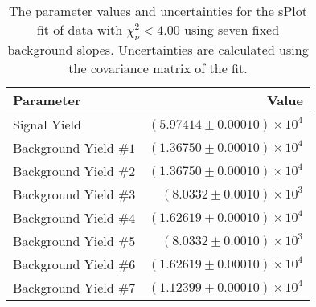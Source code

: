 
\begin{table}[ht]
    \begin{center}
        \begin{tabular}{lr}\toprule
            Parameter & Value \\\midrule
            Signal Yield & $(5.97414 \pm 0.00010) \times 10^{4}$ \\
            Background Yield $\#1$ & $(1.36750 \pm 0.00010) \times 10^{4}$ \\
            Background Yield $\#2$ & $(1.36750 \pm 0.00010) \times 10^{4}$ \\
            Background Yield $\#3$ & $(8.0332 \pm 0.0010) \times 10^{3}$ \\
            Background Yield $\#4$ & $(1.62619 \pm 0.00010) \times 10^{4}$ \\
            Background Yield $\#5$ & $(8.0332 \pm 0.0010) \times 10^{3}$ \\
            Background Yield $\#6$ & $(1.62619 \pm 0.00010) \times 10^{4}$ \\
            Background Yield $\#7$ & $(1.12399 \pm 0.00010) \times 10^{4}$ \\\bottomrule
        \end{tabular}
        \caption{The parameter values and uncertainties for the sPlot fit of data with $\chi^2_\nu < 4.00$ using seven fixed background slopes. Uncertainties are calculated using the covariance matrix of the fit.}\label{tab:splot-fit-results-chisqdof-4.00-fixed-7}
    \end{center}
\end{table}
